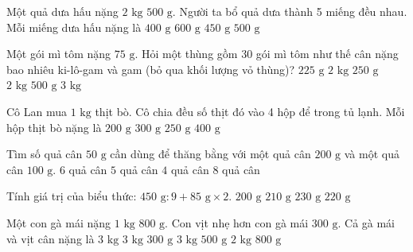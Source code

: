 \begin{ex} %
Một quả dưa hấu nặng $2\text{ kg } 500\text{ g}$. Người ta bổ quả dưa thành 5 miếng đều nhau. Mỗi miếng dưa hấu nặng là
\choice
{$400\text{ g}$}
{$600\text{ g}$}
{$450\text{ g}$}
{\True $500\text{ g}$}
\end{ex}

\begin{ex} %
Một gói mì tôm nặng $75\text{ g}$. Hỏi một thùng gồm 30 gói mì tôm như thế cân nặng bao nhiêu ki-lô-gam và gam (bỏ qua khối lượng vỏ thùng)?
\choice
{$225\text{ g}$}
{\True $2\text{ kg } 250\text{ g}$}
{$2\text{ kg } 500\text{ g}$}
{$3\text{ kg}$}
\end{ex}

\begin{ex} %
Cô Lan mua $1\text{ kg}$ thịt bò. Cô chia đều số thịt đó vào 4 hộp để trong tủ lạnh. Mỗi hộp thịt bò nặng là
\choice
{$200\text{ g}$}
{$300\text{ g}$}
{\True $250\text{ g}$}
{$400\text{ g}$}
\end{ex}

\begin{ex} %
Tìm số quả cân $50\text{ g}$ cần dùng để thăng bằng với một quả cân $200\text{ g}$ và một quả cân $100\text{ g}$.
\choice
{\True $6$ quả cân}
{$5$ quả cân}
{$4$ quả cân}
{$8$ quả cân}
\end{ex}

\begin{ex} %
Tính giá trị của biểu thức: $450\text{ g} : 9 + 85\text{ g} \times 2$.
\choice
{$200\text{ g}$}
{$210\text{ g}$}
{$230\text{ g}$}
{\True $220\text{ g}$}
\end{ex}

\begin{ex} %
Một con gà mái nặng $1\text{ kg } 800\text{ g}$. Con vịt nhẹ hơn con gà mái $300\text{ g}$. Cả gà mái và vịt cân nặng là
\choice
{$3\text{ kg}$}
{\True $3\text{ kg } 300\text{ g}$}
{$3\text{ kg } 500\text{ g}$}
{$2\text{ kg } 800\text{ g}$}
\end{ex}


